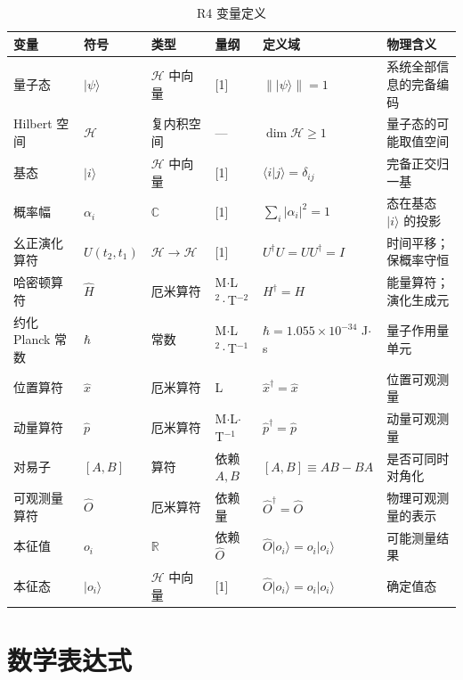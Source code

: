 \begin{table}[h]
\centering
\small
\begin{tabular}{p{2.4cm}p{1.8cm}p{2.4cm}p{1.8cm}p{3cm}p{3cm}}
\toprule
\textbf{变量} & \textbf{符号} & \textbf{类型} & \textbf{量纲} & \textbf{定义域} & \textbf{物理含义} \\
\midrule
量子态 & $|\psi\rangle$ & $\mathcal{H}$ 中向量 & [1] & $\||\psi\rangle\| = 1$ & 系统全部信息的完备编码 \\
Hilbert 空间 & $\mathcal{H}$ & 复内积空间 & — & $\dim\mathcal{H} \ge 1$ & 量子态的可能取值空间 \\
基态 & $|i\rangle$ & $\mathcal{H}$ 中向量 & [1] & $\langle i|j\rangle = \delta_{ij}$ & 完备正交归一基 \\
概率幅 & $\alpha_i$ & $\mathbb{C}$ & [1] & $\sum_i |\alpha_i|^2 = 1$ & 态在基态 $|i\rangle$ 的投影 \\
幺正演化算符 & $U(t_2,t_1)$ & $\mathcal{H}\to\mathcal{H}$ & [1] & $U^\dagger U = UU^\dagger = I$ & 时间平移；保概率守恒 \\
哈密顿算符 & $\hat{H}$ & 厄米算符 & M$\cdot$L$^2\cdot$T$^{-2}$ & $H^\dagger = H$ & 能量算符；演化生成元 \\
约化 Planck 常数 & $\hbar$ & 常数 & M$\cdot$L$^2\cdot$T$^{-1}$ & $\hbar = 1.055\times10^{-34}$ J$\cdot$s & 量子作用量单元 \\
位置算符 & $\hat{x}$ & 厄米算符 & L & $\hat{x}^\dagger = \hat{x}$ & 位置可观测量 \\
动量算符 & $\hat{p}$ & 厄米算符 & M$\cdot$L$\cdot$T$^{-1}$ & $\hat{p}^\dagger = \hat{p}$ & 动量可观测量 \\
对易子 & $[A,B]$ & 算符 & 依赖 $A,B$ & $[A,B] \equiv AB-BA$ & 是否可同时对角化 \\
可观测量算符 & $\hat{O}$ & 厄米算符 & 依赖量 & $\hat{O}^\dagger = \hat{O}$ & 物理可观测量的表示 \\
本征值 & $o_i$ & $\mathbb{R}$ & 依赖 $\hat{O}$ & $\hat{O}|o_i\rangle = o_i|o_i\rangle$ & 可能测量结果 \\
本征态 & $|o_i\rangle$ & $\mathcal{H}$ 中向量 & [1] & $\hat{O}|o_i\rangle = o_i|o_i\rangle$ & 确定值态 \\
\bottomrule
\end{tabular}
\caption{R4 变量定义}
\end{table}

\section{数学表达式}

